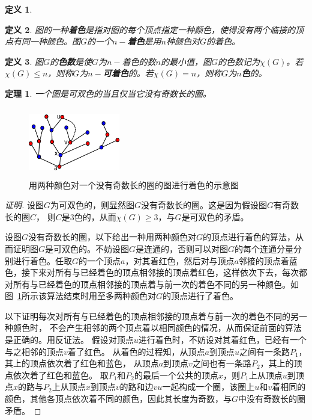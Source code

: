\documentclass{article}
\newtheorem{Def}{定义}
\newtheorem{Thm}{定理}
\begin{document}
\begin{CJK*}{UTF8}{gbsn}
\begin{Def}
  \end{Def}
  \begin{Def}
    图的一种{\bfseries 着色}是指对图的每个顶点指定一种颜色，使得没有两个临接的顶点有同一种颜色。图$G$的一个{\bfseries $n-$着色}是用$n$种颜色对$G$的着色。
  \end{Def}
  \begin{Def}
    图$G$的{\bfseries 色数}是使$G$为$n-$着色的数$n$的最小值，图$G$的色数记为$\chi(G)$。若$\chi (G) \leq n$，则称$G$为{\bfseries $n-$可着色}的。若$\chi (G) = n$，则称$G$为{\bfseries $n$色}的。
  \end{Def}
  \begin{Thm}
    一个图是可双色的当且仅当它没有奇数长的圈。
  \end{Thm}
  \renewcommand{\figurename}{图}
\begin{figure}\centering
  \includegraphics[width=4cm,height=3cm]{color26}
      \caption{用两种颜色对一个没有奇数长的圈的图进行着色的示意图}
    \label{fig:twocoloring}  
    \end{figure}
    \begin{proof}[证明]
    设图$G$为可双色的，则显然图$G$没有奇数长的圈。这是因为假设图$G$有奇数长的圈$C$，
    则$C$是3色的，从而$\chi(G) \geq 3$，与$G$是可双色的矛盾。

      设图$G$没有奇数长的圈，以下给出一种用两种颜色对$G$的顶点进行着色的算法，从而证明图$G$是可双色的。不妨设图$G$是连通的，否则可以对图$G$的每个连通分量分别进行着色。任取$G$的一个顶点$a$，对其着红色，然后对与顶点$a$邻接的顶点着蓝色，接下来对所有与已经着色的顶点相邻接的顶点着红色，这样依次下去，每次都对所有与已经着色的顶点相邻接的顶点着与前一次的着色不同的另一种颜色。如图~\ref{fig:twocoloring}所示该算法结束时用至多两种颜色对$G$的顶点进行了着色。

以下证明每次对所有与已经着色的顶点相邻接的顶点着与前一次的着色不同的另一种颜色时，
不会产生相邻的两个顶点着以相同颜色的情况，从而保证前面的算法是正确的。用反证法。
假设对顶点$u$进行着色时，不妨设对其着红色，已经有一个与之相邻的顶点$v$着了红色。
从着色的过程知，从顶点$a$到顶点$u$之间有一条路$P_1$，其上的顶点依次着了红色和蓝色，
从顶点$a$到顶点$v$之间也有一条路$P_2$，其上的顶点依次着了红色和蓝色。
取$P_1$和$P_2$的最后一个公共的顶点$x$，则$P_1$上从顶点$u$到顶点$x$的路与$P_2$上从顶点$x$到顶点$v$的路和边$vu$一起构成一个圈，该圈上$u$和$v$着相同的颜色，其他各顶点依次着不同的颜色，因此其长度为奇数，与$G$中没有奇数长的圈矛盾。 
  \end{proof}


\end{CJK*}
\end{document}
